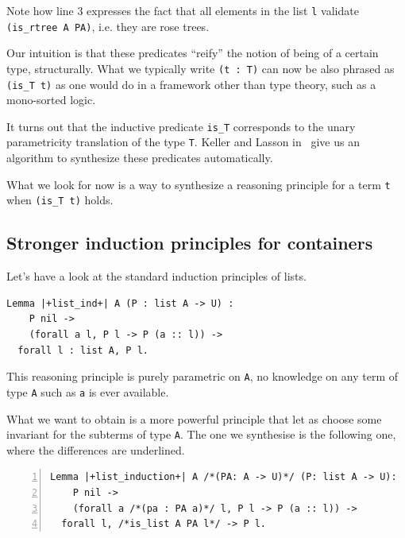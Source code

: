 \documentclass[sigplan,10pt,review]{acmart}\settopmatter{printfolios=true,printccs=false,printacmref=false}
\begin{document}
\noindent
Note how line 3 expresses the fact that all elements in the list
\lstinline+l+ validate \lstinline+(is_rtree A PA)+, i.e. they are
rose trees.

Our intuition is that these predicates ``reify'' the notion of being
of a certain type, structurally. What we typically write \lstinline+(t : T)+
can now be also phrased as \lstinline+(is_T t)+ as one would do in a
framework other than type theory, such as a mono-sorted logic.

It turns out that the inductive predicate \lstinline+is_T+ corresponds
to the unary parametricity translation of the type \lstinline+T+.
Keller and Lasson in~\cite{keller:hal-00730913} give us an
algorithm to synthesize these predicates automatically.

What we look for now is a way to synthesize
a reasoning principle for a term \lstinline+t+ when 
\lstinline+(is_T t)+ holds.

\subsection{Stronger induction principles for containers} %

Let's have a look at the standard induction principles of lists.

\begin{minipage}{\textwidth}\begin{lstlisting}
Lemma |+list_ind+| A (P : list A -> U) :
    P nil ->
    (forall a l, P l -> P (a :: l)) ->
  forall l : list A, P l.
\end{lstlisting}\end{minipage}

\noindent
This reasoning principle is purely parametric on \lstinline+A+, no
knowledge on any term of type \lstinline+A+ such as \lstinline+a+ is
ever available.

What we want to obtain is a more powerful principle that let as choose
some invariant for the subterms of type \lstinline+A+. The one we
synthesise is the following one, where the differences are underlined.

\begin{minipage}{\textwidth}\begin{lstlisting}[numbers=left]
Lemma |+list_induction+| A /*(PA: A -> U)*/ (P: list A -> U):
    P nil ->
    (forall a /*(pa : PA a)*/ l, P l -> P (a :: l)) ->
  forall l, /*is_list A PA l*/ -> P l.
\end{lstlisting}\end{minipage}
\end{document}
